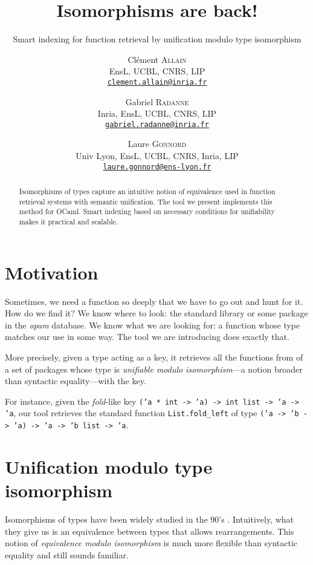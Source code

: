 \documentclass [a4paper,11pt] {scrartcl}
\title {Isomorphisms are back!}
\subtitle {Smart indexing for function retrieval by unification modulo type isomorphism}
\author {
	  Clément \textsc {Allain} \\
	  EnsL, UCBL, CNRS, LIP \\
	  \href {mailto:clement.allain@inria.fr}
	  {\nolinkurl {clement.allain@inria.fr}}
  \and
  \and
	  Gabriel \textsc {Radanne} \\
	  Inria, EnsL, UCBL, CNRS, LIP \\
	  \href {mailto:gabriel.radanne@inria.fr}
	  {\nolinkurl {gabriel.radanne@inria.fr}}
  \and
	  Laure \textsc {Gonnord} \\
	  Univ Lyon, EnsL, UCBL, CNRS, Inria, LIP \\
	  \href {mailto:laure.gonnord@ens-lyon.fr}
	  {\nolinkurl {laure.gonnord@ens-lyon.fr}}
}
\date {}
\begin{document}
\maketitle


\begin {abstract}
	Isomorphisms of types capture an intuitive notion of equivalence used in function retrieval systems with semantic unification. The tool we present implements this method for OCaml. Smart indexing based on necessary conditions for unifiability makes it practical and scalable.
\end {abstract}


\section {Motivation}

Sometimes, we need a function so deeply that we have to go out and hunt for it. How do we find it? We know where to look: the standard library or some package in the \textit {opam} database. We know what we are looking for: a function whose type matches our use in some way. The tool we are introducing does exactly that.

More precisely, given a type acting as a key, it retrieves all the functions from of a set of packages whose type is \textit {unifiable modulo isomorphism}—a notion broader than syntactic equality—with the key.

For instance, given the \textit{fold}-like key \texttt {('a * int -> 'a) -> int list -> 'a -> 'a}, our tool retrieves the standard function \texttt {List.fold\_left} of type \texttt {('a -> 'b -> 'a) -> 'a -> 'b list -> 'a}.


\section {Unification modulo type isomorphism}

Isomorphisms of types have been widely studied in the 90's \cite {dicosmo}. Intuitively, what they give us is an equivalence between types that allows rearrangements. This notion of \textit {equivalence modulo isomorphism} is much more flexible than syntactic equality and still sounds familiar.
\end{document}
